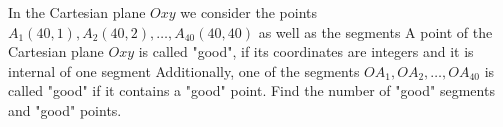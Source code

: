 In the Cartesian plane $Oxy$ we consider the points ${A_1}\left( {40,1} \right), {A_2}\left( {40,2} \right), \ldots , {A_{40}}\left( {40,40} \right)$ as well as the segments  A point of the Cartesian plane $Oxy$ is called "good", if its coordinates are integers and it is internal of one segment  Additionally, one of the segments $O{A_1},O{A_2},\ldots,O{A_{40}}$ is called "good" if  it contains a "good" point. Find the number of "good" segments and "good" points.